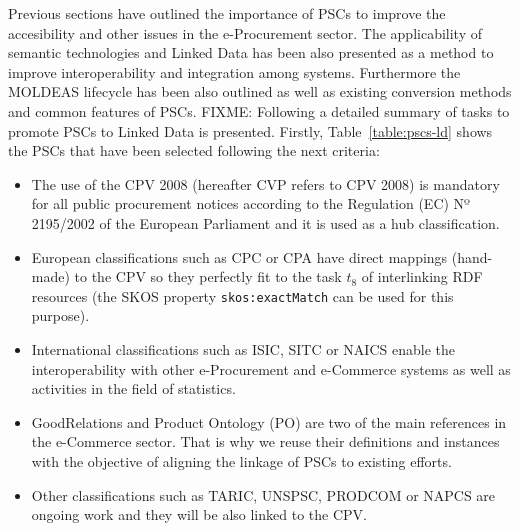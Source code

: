 Previous sections have outlined the importance of PSCs to improve the accesibility and other issues in 
the e-Procurement sector. The applicability of semantic technologies and Linked Data has been also presented 
as a method to improve interoperability and integration among systems. Furthermore the MOLDEAS lifecycle has been 
also outlined as well as existing conversion methods and common features of PSCs. FIXME: Following a detailed 
summary of tasks to promote PSCs to Linked Data is presented. Firstly, Table~\ref{table:pscs-ld} shows 
the PSCs that have been selected following the next criteria:
\begin{itemize}
 \item The use of the CPV 2008 (hereafter CVP refers to CPV 2008) is mandatory for all public procurement notices according 
 to the Regulation (EC) Nº 2195/2002 of the European Parliament and it is used as a hub classification.
 \item European classifications such as CPC or CPA have direct mappings (hand-made) to the CPV so they perfectly fit 
 to the task $t_8$ of interlinking RDF resources (the SKOS property \texttt{skos:exactMatch} can be used for this purpose).
 \item International classifications such as ISIC, SITC or NAICS enable the interoperability with 
 other e-Procurement and e-Commerce systems as well as activities in the field of statistics.
 \item GoodRelations and Product Ontology (PO) are two of the main references in the e-Commerce sector. 
 That is why we reuse their definitions and instances with the objective of aligning the linkage of PSCs to existing efforts. 
 \item Other classifications such as TARIC, UNSPSC, PRODCOM or NAPCS are ongoing work and they will be also linked to the CPV.
\end{itemize}


